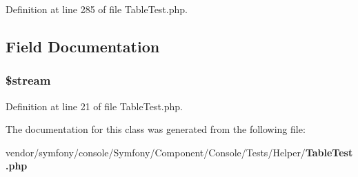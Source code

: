 Definition at line 285 of file Table\+Test.\+php.



\subsection{Field Documentation}
\subsubsection[{\$stream}]{\setlength{\rightskip}{0pt plus 5cm}\${\bf stream}\hspace{0.3cm}{\ttfamily [protected]}}\label{class_symfony_1_1_component_1_1_console_1_1_tests_1_1_helper_1_1_table_test_aa658946a5d6cb700e35df1fc7854e7b3}


Definition at line 21 of file Table\+Test.\+php.



The documentation for this class was generated from the following file\+:\begin{DoxyCompactItemize}
\item 
vendor/symfony/console/\+Symfony/\+Component/\+Console/\+Tests/\+Helper/{\bf Table\+Test.\+php}\end{DoxyCompactItemize}
